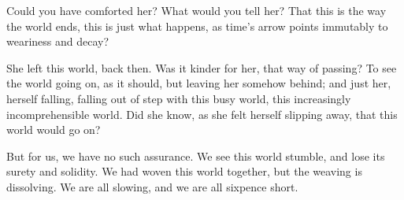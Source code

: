 Could you have comforted her? What would you tell her? That this is the
way the world ends, this is just what happens, as time's arrow points
immutably to weariness and decay?

She left this world, back then. Was it kinder for her, that way of
passing? To see the world going on, as it should, but leaving her
somehow behind; and just her, herself falling, falling out of step with
this busy world, this increasingly incomprehensible world. Did she know,
as she felt herself slipping away, that this world would go on?

But for us, we have no such assurance. We see this world stumble, and
lose its surety and solidity. We had woven this world together, but the
weaving is dissolving. We are all slowing, and we are all sixpence
short.
